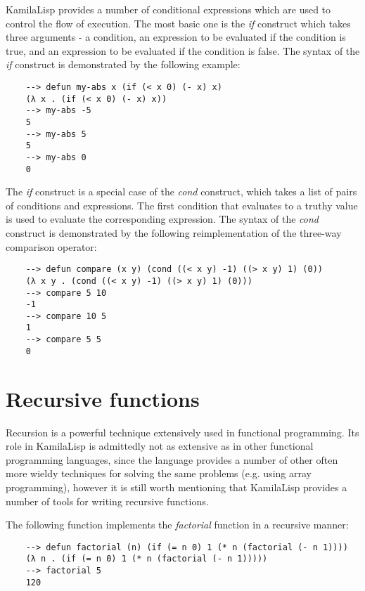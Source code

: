 KamilaLisp provides a number of conditional expressions which are used to control the flow of execution. The most basic one is the \textit{if} construct which takes three arguments - a condition, an expression to be evaluated if the condition is true, and an expression to be evaluated if the condition is false. The syntax of the \textit{if} construct is demonstrated by the following example:

\begin{Verbatim}
    --> defun my-abs x (if (< x 0) (- x) x)
    (λ x . (if (< x 0) (- x) x))
    --> my-abs -5
    5
    --> my-abs 5
    5
    --> my-abs 0
    0
\end{Verbatim}

The \textit{if} construct is a special case of the \textit{cond} construct, which takes a list of pairs of conditions and expressions. The first condition that evaluates to a truthy value is used to evaluate the corresponding expression. The syntax of the \textit{cond} construct is demonstrated by the following reimplementation of the three-way comparison operator:

\begin{Verbatim}
    --> defun compare (x y) (cond ((< x y) -1) ((> x y) 1) (0))
    (λ x y . (cond ((< x y) -1) ((> x y) 1) (0)))
    --> compare 5 10
    -1
    --> compare 10 5
    1
    --> compare 5 5
    0
\end{Verbatim}

\section{Recursive functions}

Recursion is a powerful technique extensively used in functional programming. Its role in KamilaLisp is admittedly not as extensive as in other functional programming languages, since the language provides a number of other often more wieldy techniques for solving the same problems (e.g. using array programming), however it is still worth mentioning that KamilaLisp provides a number of tools for writing recursive functions.

The following function implements the \textit{factorial} function in a recursive manner:

\begin{Verbatim}
    --> defun factorial (n) (if (= n 0) 1 (* n (factorial (- n 1))))
    (λ n . (if (= n 0) 1 (* n (factorial (- n 1)))))
    --> factorial 5
    120
\end{Verbatim}

